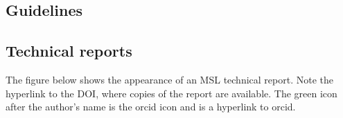 {%
%
%	
%	
%	
%	
%	  
%
%

\subsection{Guidelines}
\subsection{Technical reports}
The figure below shows the appearance of an MSL technical report. Note the hyperlink to the DOI, where copies of the report are available. The green icon after the author's name is the orcid icon and is a hyperlink to orcid.

}
